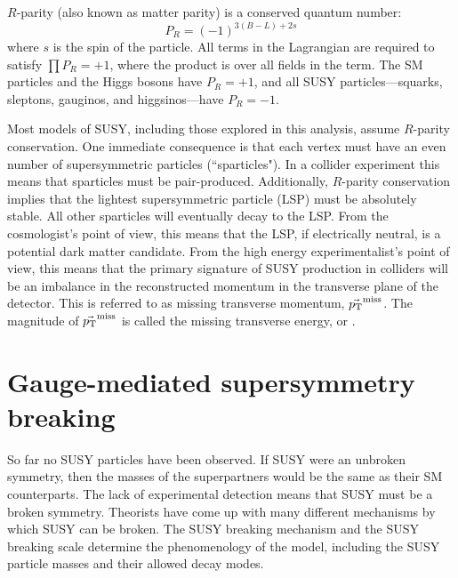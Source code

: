 $R$-parity (also known as matter parity) is a conserved quantum number:
\begin{equation}
P_R = (-1)^{3(B-L)+2s}
\end{equation}
where $s$ is the spin of the particle. All terms in the Lagrangian are required to satisfy $\prod P_{R} = +1$, where the product
is over all fields in the term. The SM particles and the Higgs bosons have $P_R = +1$, and
all SUSY particles---squarks, sleptons, gauginos, and higgsinos---have $P_R = -1$.

Most models of SUSY, including those explored in this analysis, assume $R$-parity conservation.
One immediate consequence is that each vertex must have an even number of supersymmetric particles (``sparticles").
In a collider experiment 
this means that sparticles must be pair-produced.
Additionally, $R$-parity conservation implies that the lightest supersymmetric particle (LSP) must be absolutely stable.
All other sparticles will eventually decay to the LSP. From the cosmologist's point of view, this means that the LSP, if electrically neutral, 
is a potential dark matter candidate.
From the high energy experimentalist's point of view, this means that the 
primary signature of SUSY production in colliders will be an imbalance in the reconstructed momentum in the transverse
plane of the detector. This is referred to as missing 
transverse momentum, $\vec{p_{\mathrm{T}}}^{\mathrm{miss}}$. The magnitude of $\vec{p_{\mathrm{T}}}^{\mathrm{miss}}$ is called the
missing transverse energy, or \ETmiss.




\section{Gauge-mediated supersymmetry breaking}
\label{sec:gmsb}

So far no SUSY particles have been observed. If SUSY were an unbroken symmetry, then the masses of the superpartners
would be the same as their SM counterparts. The lack of experimental detection means that SUSY must be a broken symmetry.
Theorists have come up with many different mechanisms by which SUSY can be broken. 
The SUSY breaking mechanism and the SUSY breaking scale 
determine the phenomenology of the model, including the SUSY particle masses and their allowed decay modes.

